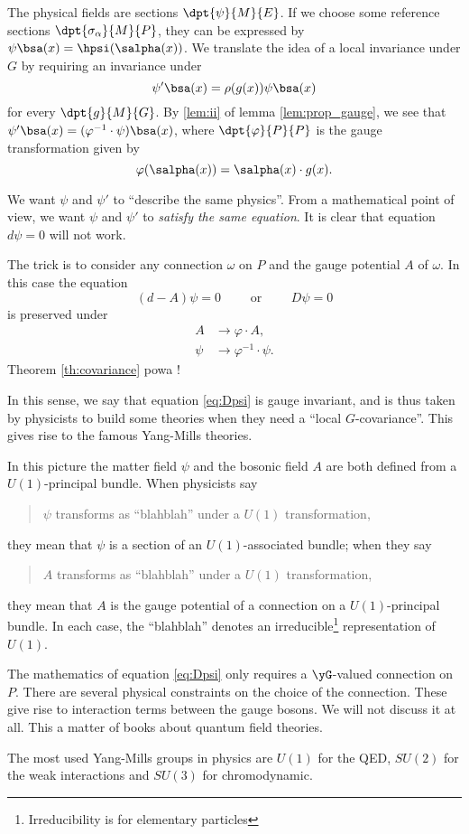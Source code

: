 The physical fields are sections $\dpt{\psi}{M}{E}$. If we choose some reference sections $\dpt{\sigma_{\alpha}}{M}{P}$, they can be expressed by $\psi\bsa(x)=\hpsi(\salpha(x))$. We translate the idea of a local invariance under $G$ by requiring an invariance under
\[
     \psi'\bsa(x)=\rho(g(x))\psi\bsa(x)
\]
for every $\dpt{g}{M}{G}$. By \ref{lem:ii} of lemma \ref{lem:prop_gauge}, we see that $\psi'\bsa(x)=(\varphi^{-1}\cdot\psi)\bsa(x)$, where $\dpt{\varphi}{P}{P}$ is the gauge transformation given by
\[
   \varphi(\salpha(x))=\salpha(x)\cdot g(x).
\]

We want $\psi$ and $\psi'$ to ``describe the same physics''. From a mathematical point of view, we want $\psi$ and $\psi'$ to \emph{satisfy the same equation}. It is clear that equation $d\psi=0$ will not work.

The trick is to consider any connection $\omega$ on $P$ and the gauge potential $A$ of $\omega$. In this case the equation
\begin{equation}\label{eq:Dpsi}
    (d-A)\psi=0\qquad\textrm{ or }\qquad D\psi=0
\end{equation}
is preserved under 
\[ 
 \begin{split}
A&\rightarrow\varphi\cdot A,\\
 \psi&\rightarrow\varphi^{-1}\cdot\psi.
\end{split} 
\]
 Theorem \ref{th:covariance} powa !
        
In this sense, we say that equation \eqref{eq:Dpsi} is gauge invariant, and is thus taken by physicists to build some theories when they need a ``local $G$-covariance''. This gives rise to the famous Yang-Mills theories.

In this picture the matter field $\psi$ and the bosonic field $A$ are both defined from a $U(1)$-principal bundle. When physicists say 
\begin{quote}
	$\psi$ transforms as ``blahblah'' under a $U(1)$ transformation,
\end{quote}
they mean that $\psi$ is a section of an $U(1)$-associated bundle; 
when they say
\begin{quote}
	$A$ transforms as ``blahblah'' under a $U(1)$ transformation,
\end{quote}
they mean that $A$ is the gauge potential of a connection on a $U(1)$-principal bundle. In each case, the ``blahblah'' denotes an irreducible\footnote{Irreducibility is for elementary particles} representation of $U(1)$.

\begin{remark}
The mathematics of equation \eqref{eq:Dpsi} only requires a $\yG$-valued connection on $P$. There are several physical constraints on the choice of the connection. These give rise to interaction terms between the gauge bosons. We will not discuss it at all. This a matter of books about quantum field theories.

The most used Yang-Mills groups in physics are $U(1)$ for the QED, $SU(2)$ for the weak interactions and $SU(3)$ for chromodynamic.
\end{remark}


